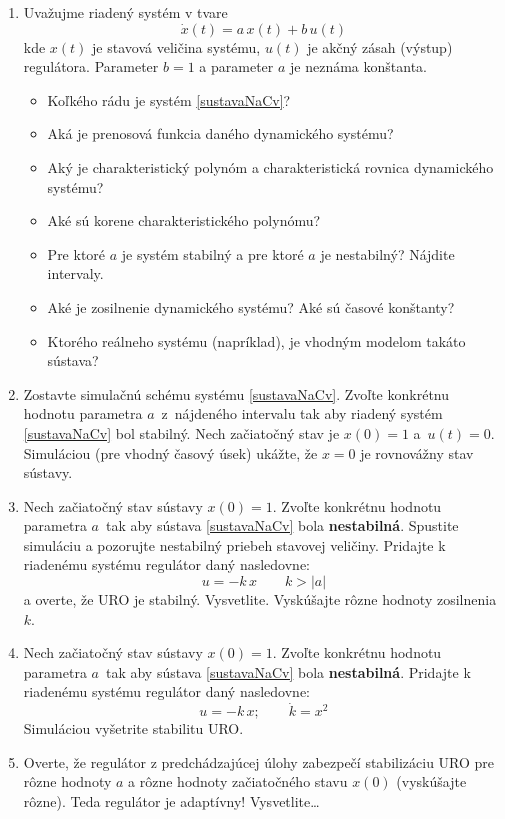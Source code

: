 \documentclass[a4paper, 10pt, ]{article}
\begin{document}
\begin{enumerate}[leftmargin=0pt, labelsep=3mm, itemsep=0pt]

	\item  Uvažujme riadený systém v tvare
	\begin{equation}
		\dot{x}(t) = a\, x(t) + b \, u(t) \label{sustavaNaCv}
	\end{equation}
	kde $x(t)$ je stavová veličina systému, $u(t)$ je akčný zásah (výstup) regulátora. Parameter $b = 1$ a parameter $a$ je neznáma konštanta.
    \begin{itemize}
		\item Koľkého rádu je systém \eqref{sustavaNaCv}?
		\item Aká je prenosová funkcia daného dynamického systému?
		\item Aký je charakteristický polynóm a charakteristická rovnica dynamického systému?
		\item Aké sú korene charakteristického polynómu?
		\item Pre ktoré $a$ je systém stabilný a pre ktoré $a$ je nestabilný? Nájdite intervaly.
		\item Aké je zosilnenie dynamického systému? Aké sú časové konštanty?
		\item Ktorého reálneho systému (napríklad), je vhodným modelom takáto sústava?
	\end{itemize}

	\item Zostavte simulačnú schému systému \eqref{sustavaNaCv}. Zvoľte konkrétnu hodnotu parametra $a$~z~nájdeného intervalu tak aby riadený systém \eqref{sustavaNaCv} bol stabilný. Nech začiatočný stav je $x(0) = 1$ a~$u(t)=0$. Simuláciou (pre vhodný časový úsek) ukážte, že $x = 0$ je rovnovážny stav sústavy.

	\item Nech začiatočný stav sústavy $x(0) = 1$. Zvoľte konkrétnu hodnotu parametra $a$~tak aby sústava \eqref{sustavaNaCv} bola \textbf{nestabilná}. Spustite simuláciu a pozorujte nestabilný priebeh stavovej veličiny. Pridajte k riadenému systému regulátor daný nasledovne:
	\begin{equation}
		u = -k\, x \qquad k > \left| a \right|
	\end{equation}
	a overte, že URO je stabilný. Vysvetlite. Vyskúšajte rôzne hodnoty zosilnenia $k$.

	\item Nech začiatočný stav sústavy $x(0) = 1$. Zvoľte konkrétnu hodnotu parametra $a$~tak aby sústava \eqref{sustavaNaCv} bola \textbf{nestabilná}. Pridajte k riadenému systému regulátor daný nasledovne:
	\begin{equation}
		u = -k\, x; \qquad \dot{k} = x^2
	\end{equation}
	Simuláciou vyšetrite stabilitu URO.

	\item Overte, že regulátor z predchádzajúcej úlohy zabezpečí stabilizáciu URO pre rôzne hodnoty $a$ a rôzne hodnoty začiatočného stavu $x(0)$ (vyskúšajte rôzne). Teda regulátor je adaptívny! Vysvetlite\ldots

\end{enumerate}
\end{document}
